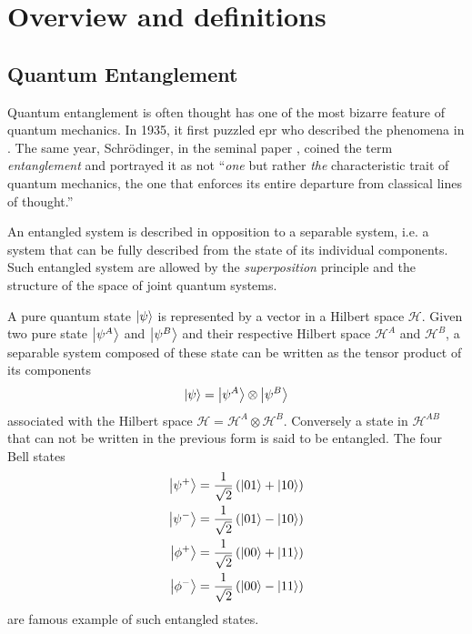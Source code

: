 \part{Overview and definitions}


\chapter{Quantum Entanglement}
\label{section:entanglement}

Quantum entanglement is often thought has one of the most bizarre feature of quantum mechanics. 
In 1935, it first puzzled \acrfull{epr} who described the phenomena in \cite{Einstein35}. 
The same year, Schrödinger, in the seminal paper \cite{Schrödinger35},
coined the term \textit{entanglement} and portrayed it as not \enquote{\textit{one} but rather \textit{the} characteristic trait of quantum mechanics, the one that enforces its entire departure from classical lines of thought.}

An entangled system is described in opposition to a separable system, i.e. a system that can be fully described from the state of its individual components. 
Such entangled system are allowed by the \textit{superposition} principle and the structure of the space of joint quantum systems. 

A pure quantum state $\ket{\psi}$ is represented by a vector in a Hilbert space $\mathscr{H}$.
Given two pure state $\ket{\psi^A}$ and $\ket{\psi^B}$ and their respective Hilbert space $\mathscr{H}^A$ and $\mathscr{H}^B$, a separable system composed of these state can be written as the tensor product of its components
\begin{equation}
	\ket{\psi} = \ket{\psi^A} \otimes \ket{\psi^B}
	\label{eq:separable_state}
\end{equation}
associated with the Hilbert space $\mathscr{H}=\mathscr{H}^A\otimes\mathscr{H}^B$. 
Conversely a state in $\mathscr{H}^{AB}$ that can not be written in the previous form is said to be entangled.
The four Bell states 
\begin{align}
	\ket{\psi^+} &= \frac{1}{\sqrt{2}}\left(\ket{01}+\ket{10}\right) \\
	\ket{\psi^-} &= \frac{1}{\sqrt{2}}\left(\ket{01}-\ket{10}\right) \\
	\ket{\phi^+} &= \frac{1}{\sqrt{2}}\left(\ket{00}+\ket{11}\right) \\
	\ket{\phi^-} &= \frac{1}{\sqrt{2}}\left(\ket{00}-\ket{11}\right)
	\label{eq:bell_states}
\end{align}
are famous example of such entangled states.

